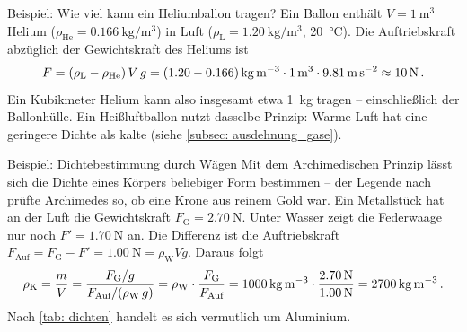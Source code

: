 \begin{examplebox}[]{Beispiel: Wie viel kann ein Heliumballon tragen?}
    Ein Ballon enthält $V = \SI{1}{\meter\cubed}$ Helium ($\rho_\text{He} = \SI{0.166}{\kilogram\per\meter\cubed}$) in Luft ($\rho_\text{L} = \SI{1.20}{\kilogram\per\meter\cubed}$, \SI{20}{\celsius}). Die Auftriebskraft abzüglich der Gewichtskraft des Heliums ist
    \begin{equation*}
        F = (\rho_\text{L} - \rho_\text{He})\, V\, g = (\num{1.20} - \num{0.166})\,\si{\kilogram\per\meter\cubed} \cdot \SI{1}{\meter\cubed} \cdot \SI{9.81}{\meter\per\second\squared} \approx \SI{10}{\newton} \,.
    \end{equation*}
    Ein Kubikmeter Helium kann also insgesamt etwa \SI{1}{\kilo\gram} tragen -- einschließlich der Ballonhülle. Ein Heißluftballon nutzt dasselbe Prinzip: Warme Luft hat eine geringere Dichte als kalte (siehe \cref{subsec: ausdehnung_gase}).
\end{examplebox}

\begin{examplebox}[]{Beispiel: Dichtebestimmung durch Wägen}
    Mit dem Archimedischen Prinzip lässt sich die Dichte eines Körpers beliebiger Form bestimmen -- der Legende nach prüfte Archimedes so, ob eine Krone aus reinem Gold war. Ein Metallstück hat an der Luft die Gewichtskraft $F_\text{G} = \SI{2.70}{\newton}$. Unter Wasser zeigt die Federwaage nur noch $F' = \SI{1.70}{\newton}$ an. Die Differenz ist die Auftriebskraft $F_\text{Auf} = F_\text{G} - F' = \SI{1.00}{\newton} = \rho_\text{W} V g$. Daraus folgt
    \begin{equation*}
        \rho_\text{K} = \frac{m}{V} = \frac{F_\text{G}/g}{F_\text{Auf}/(\rho_\text{W}\, g)} = \rho_\text{W} \cdot \frac{F_\text{G}}{F_\text{Auf}} = \SI{1000}{\kilogram\per\meter\cubed} \cdot \frac{\SI{2.70}{\newton}}{\SI{1.00}{\newton}} = \SI{2700}{\kilogram\per\meter\cubed} \,.
    \end{equation*}
    Nach \cref{tab: dichten} handelt es sich vermutlich um Aluminium.
\end{examplebox}

\newpage
